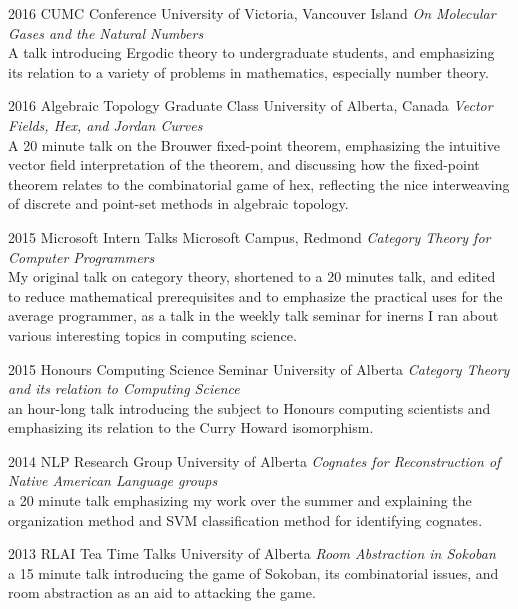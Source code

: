 \documentclass{friggeri-cv}
\begin{document}
\begin{entrylist}


\entry
{2016}
{CUMC Conference}
{University of Victoria, Vancouver Island}
{\emph{On Molecular Gases and the Natural Numbers}\\
A talk introducing Ergodic theory to undergraduate students, and emphasizing its relation to a variety of problems in mathematics, especially number theory.}


\entry
{2016}
{Algebraic Topology Graduate Class}
{University of Alberta, Canada}
{\emph{Vector Fields, Hex, and Jordan Curves}\\
A 20 minute talk on the Brouwer fixed-point theorem, emphasizing the intuitive vector field interpretation of the theorem, and discussing how the fixed-point theorem relates to the combinatorial game of hex, reflecting the nice interweaving of discrete and point-set methods in algebraic topology.}


    
\entry
{2015}
{Microsoft Intern Talks}
{Microsoft Campus, Redmond}
{\emph{Category Theory for Computer Programmers}\\
My original talk on category theory, shortened to a 20 minutes talk, and edited to reduce mathematical prerequisites and to emphasize the practical uses for the average programmer, as a talk in the weekly talk seminar for inerns I ran about various interesting topics in computing science.}


\entry
{2015}
{Honours Computing Science Seminar}
{University of Alberta}
{\emph{Category Theory and its relation to Computing Science}\\
an hour-long talk introducing the subject to Honours computing scientists and emphasizing its relation to the Curry Howard isomorphism.}


\entry
{2014}
{NLP Research Group}
{University of Alberta}
{\emph{Cognates for Reconstruction of Native American Language groups}\\
a 20 minute talk emphasizing my work over the summer and explaining the organization method and SVM classification method for identifying cognates.}


\entry
{2013}
{RLAI Tea Time Talks}
{University of Alberta}
{\emph{Room Abstraction in Sokoban}\\
a 15 minute talk introducing the game of Sokoban, its combinatorial issues, and room abstraction as an aid to attacking the game.}

\end{entrylist}
\end{document}
